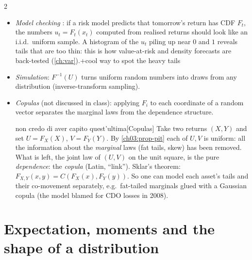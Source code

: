 \begin{paracol}{2}
\begin{finance}
\begin{itemize}
  \item \emph{Model checking} : if a risk model predicts that tomorrow's return has CDF
        $F_t$, the numbers $u_t=F_t(x_t)$ computed from realised returns should look like an i.i.d.\
        uniform sample. A histogram of the $u_t$ piling up near $0$ and $1$ reveals tails that are too
        thin: this is how value-at-risk and density forecasts are back-tested (\cref{ch:var}).\note+{cool way to spot the heavy tails}
  \item \emph{Simulation}: $F^{-1}(U)$ turns uniform random numbers into draws from any distribution
        (inverse-transform sampling).
  \item \emph{Copulas} (not discussed in class): applying $F_i$ to each coordinate of a random vector
        separates the marginal laws from the dependence structure.\begin{answer}{non credo di aver capito quest'ultima}[Copulas]
Take two returns $(X,Y)$ and set $U=F_X(X)$, $V=F_Y(Y)$. By \cref{ch03:prop-pit} each of $U,V$ is uniform:
all the information about the \emph{marginal} laws (fat tails, skew) has been removed. What is left, the joint
law of $(U,V)$ on the unit square, is the pure \emph{dependence}: the \emph{copula} (Latin, ``link''). Sklar's
theorem: $F_{X,Y}(x,y)=C(F_X(x),F_Y(y))$. So one can model each asset's tails and their co-movement
separately, e.g.\ fat-tailed marginals glued with a Gaussian copula (the model blamed for CDO losses in 2008).
\end{answer}
\end{itemize}
\end{finance}

\section{Expectation, moments and the shape of a distribution}\label{ch03:sec-moments}


\end{paracol}
